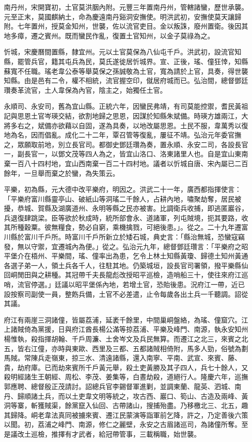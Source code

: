 \begin{pinyinscope}
南丹州，宋開寶初，土官莫洪胭內附。元豐三年置南丹州，管轄諸蠻，歷世承襲。元至正末，莫國麒納土，命為慶遠南丹谿洞安撫使。明洪武初，安撫使莫天讓歸附。七年置州，授莫金知州，世襲，佐以流官吏目。金以叛誅，廢州置衛。後因其地多瘴，遷之賓州。既而蠻民作亂，復置土官知州，以金子莫祿為之。

忻城，宋慶曆間置縣，隸宜州。元以土官莫保為八仙屯千戶。洪武初，設流官知縣，罷管兵官，籍其屯兵為民，莫氏遂徙居忻城界。宣、正後，瑤、僮狂悻，知縣蘇寬不任職。瑤老韋公泰等舉莫保之孫誠敬為土官，寬為請於上官，具奏，得世襲知縣。由是邑有二令，權不相統，流官握空印，僦居府城而已。弘治間，總督鄧廷瓚奏革流官，土人韋保為內官，陰主之，始獨任土官。

永順司、永安司，舊為宜山縣。正統六年，因蠻民弗靖，有司莫能控禦，耆民黃祖記與思恩土官岑瑛交結，欲割地歸之思恩，因謀於知縣朱斌備。時瑛方雄兩江，大將多右之，斌備亦欲藉以自固，遂為具奏，以地改屬思恩。土民不服，韋萬秀以復地為名，因而倡亂。成化二十二年，覃召管等復亂，屢征不靖。弘治元年委官撫之，眾願取前地，別立長官司。都御史鄧廷瓚為奏，置永順、永安二司，各設長官一，副長官一，以鄧文茂等四人為之，皆宜山洛口、洛東諸里人也。自是宜山東南棄一百八十四村地，宜山西南棄一百二十四村地。議者以忻城自唐、宋內屬已二百餘年，一旦舉而棄之於蠻，為失策云。

平樂，初為縣，元大德中改平樂府，明因之。洪武二十一年，廣西都指揮使言：「平樂府富川縣靈亭山、破紙山等洞瑤二千餘人，占耕內地，嘯聚劫奪，居民被擾，恭城、賀縣及湖廣道州、永明等縣之民亦被害。比調衛兵收捕，即逃匿巖谷，兵退復肆跳梁。臣等欲於秋成時，統所部會永、道諸軍，列屯賊境，扼其要路，收其所種穀粟。彼無糧食，勢必自窮，乘機擒戮，可絕後患。」。從之。二十九年遷富川縣於富川千戶所。時富川千戶所新立於矮石城，典史言：「縣治無城，恐蠻寇竊發，無以守禦，宜遷城內為便。」從之。弘治元九年，總督鄧廷瓚言：「平樂府之昭平堡介在梧州、平樂間，瑤、僮率出為患，乞令上林土知縣黃瓊、歸德土知州黃通各選子弟一人，領土兵各千人，往駐其地。仍築城垣，設長官司署領，撥平樂縣仙回峒閒田與之耕種。其冠帶千夫長龍彪改授昭平巡檢，造哨船三十，使往來府江巡哨，流官停選。」廷議以昭平堡係內地，若增土官，恐貽後患。況府江一帶，近已設按察司副使一員，整飭兵備，土官不必差遣，止令每歲各出土兵一千聽調。詔從其議。

府江有兩崖三洞諸僮，皆屬荔浦，延袤千餘里，中間巢峒盤絡，為瑤、僮窟穴。江上諸賊倚為黨援，日與府江酋長楊公滿等掠荔浦、平樂及峰門、南源，執永安知州楊惟執，殺指揮胡翰、千戶周濂、土舍岑文及兵民無算。而遷江之北三，來賓之北五，皆右江僮，亦時與東歐、西里及三都、五都諸賊相倚附，馬多人勁，俗號為劃馬賊。常陳兵走嶺東，掠三水、清遠諸縣，還入南寧、平南、武宣、來賓、藤、貴，劫府庫。已而劫來賓所千戶黃元舉，殺土吏黃勝及其子四人，兵七十餘人，又殺明經諸生王朝經、周松、李茂、姜集等，白晝劫殺，道絕行人。隆慶六年，巡撫郭應聘、總督殷正茂請討。詔總兵官李錫督軍進剿，並調東蘭、龍英、泗城、南丹、歸順諸土兵，而以土吏韋文明等統之，攻古西、巖口、筍山、古造及兩峰、黃洞等寨，斬獲賊渠，餘黨竄入仙回、古帶諸山，搜捕殆盡。乃移檄北三、北五，趣其歸降。峒老韋法真同被擄來賓、遷江民蒙演等詣軍前乞降，許之，乃定善後六策以聞。初，荔浦之峰門、南源，修仁之麗壁，永安之古眉諸巡司，為諸僮所奪。至是議改土巡檢，推擇有才武者，給冠帶管事，三載稱職，始世襲。


\end{pinyinscope}
